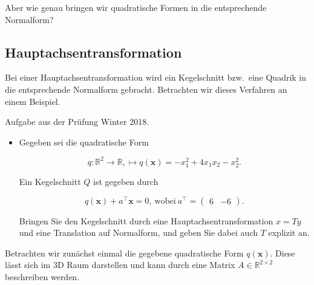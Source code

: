 Aber wie genau bringen wir quadratische Formen in die entsprechende Normalform?

\subsection{Hauptachsentransformation}

Bei einer Hauptachsentransformation wird ein Kegelschnitt bzw.\ eine Quadrik in die entsprechende Normalform gebracht. Betrachten wir dieses Verfahren an einem Beispiel. 

\vspace{1\baselineskip}

Aufgabe aus der Prüfung Winter 2018. 
\begin{itemize}
    \item Gegeben sei die quadratische Form 

    \begin{equation*}
        q: \mathbb{R}^2 \to \mathbb{R}, \mapsto q(\mathbf{x})=-x_1^2+4x_1x_2-x_2^2.
    \end{equation*}

    Ein Kegelschnitt \( Q \) ist gegeben durch 

    \begin{equation*}
        q(\mathbf{x}) + a^\top \mathbf{x} = 0, \ \text{wobei} \ a^\top = \begin{pmatrix} 6 & -6 \end{pmatrix}.
    \end{equation*}

    Bringen Sie den Kegelschnitt durch eine Hauptachsentransformation \( x = Ty \) und eine Translation auf Normalform, und geben Sie dabei auch \( T \) explizit an. 

\end{itemize}

Betrachten wir zunächst einmal die gegebene quadratische Form \( q(\mathbf{x}) \). Diese lässt sich im 3D Raum darstellen und kann durch eine Matrix \( A \in \mathbb{R}^{2 \times 2} \) beschreiben werden. 

